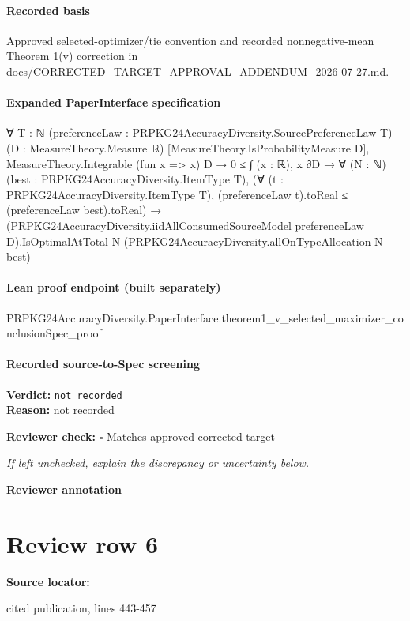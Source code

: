 \documentclass[10pt]{article}
\newcommand{\reviewerbox}{%
  \par\noindent\fbox{\parbox{0.96\linewidth}{\rule{0pt}{0.38in}}}\par
}
\newcommand{\reviewmatch}[1]{%
  \par\noindent\textbf{Reviewer check:} $\square$\; #1\par
  \noindent\emph{If left unchecked, explain the discrepancy or uncertainty below.}\par
}
\begin{document}
\paragraph{Recorded basis}
Approved selected-\allowbreak{}optimizer/\allowbreak{}tie convention and recorded nonnegative-\allowbreak{}mean Theorem 1(v) correction in docs/\allowbreak{}CORRECTED\_\allowbreak{}TARGET\_\allowbreak{}APPROVAL\_\allowbreak{}ADDENDUM\_\allowbreak{}2026-\allowbreak{}07-\allowbreak{}27.\allowbreak{}md.\allowbreak{}
\paragraph{Expanded PaperInterface specification}
\begin{ReviewVerbatim}
∀ {T : ℕ} (preferenceLaw : PRPKG24AccuracyDiversity.SourcePreferenceLaw T) (D : MeasureTheory.Measure ℝ)
  [MeasureTheory.IsProbabilityMeasure D],
  MeasureTheory.Integrable (fun x => x) D →
    0 ≤ ∫ (x : ℝ), x ∂D →
      ∀ (N : ℕ) (best : PRPKG24AccuracyDiversity.ItemType T),
        (∀ (t : PRPKG24AccuracyDiversity.ItemType T), (preferenceLaw t).toReal ≤ (preferenceLaw best).toReal) →
          (PRPKG24AccuracyDiversity.iidAllConsumedSourceModel preferenceLaw D).IsOptimalAtTotal N
            (PRPKG24AccuracyDiversity.allOnTypeAllocation N best)
\end{ReviewVerbatim}

\paragraph{Lean proof endpoint (built separately)}\begin{ReviewVerbatim}
PRPKG24AccuracyDiversity.PaperInterface.theorem1_v_selected_maximizer_conclusionSpec_proof
\end{ReviewVerbatim}

\paragraph{Recorded source-to-Spec screening}
\textbf{Verdict:} \texttt{not recorded}
\\
\textbf{Reason:} not recorded
\reviewmatch{Matches approved corrected target}
\noindent\textbf{Reviewer annotation}\par
\reviewerbox
\clearpage
\hypertarget{source-claim-e7ae4618a91038ee}{}
\section*{Review row 6}
\textbf{Source locator:} {\footnotesize\raggedright cited publication, lines 443-\allowbreak{}457\par}
\end{document}
